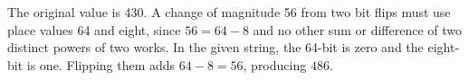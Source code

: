 The original value is 430. A change of magnitude 56 from two bit flips must use place values 64 and eight, since $56=64-8$ and no other sum or difference of two distinct powers of two works. In the given string, the 64-bit is zero and the eight-bit is one. Flipping them adds $64-8=56$, producing $\boxed{486}$.
